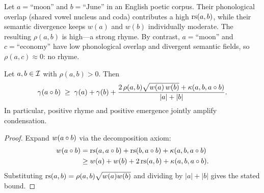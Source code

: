 \begin{example}
\label{ex:phono-rhyme}
Let $a = \text{``moon''}$ and $b = \text{``June''}$ in an English
poetic corpus.  Their phonological overlap (shared vowel nucleus and
coda) contributes a high $\mathrm{rs}(a,b)$, while their semantic divergence
keeps $w(a)$ and $w(b)$ individually moderate.  The resulting
$\rho(a,b)$ is high---a strong rhyme.  By contrast, $a =
\text{``moon''}$ and $c = \text{``economy''}$ have low phonological
overlap and divergent semantic fields, so $\rho(a,c) \approx 0$:
no rhyme.
\end{example}

\begin{theorem}
\label{thm:rhyme-condensation}
Let $a,b \in \mathcal{I}$ with $\rho(a,b) > 0$.  Then
\[
  \gamma(a \circ b)
  \;\ge\;
  \gamma(a) + \gamma(b)
  + \frac{2\,\rho(a,b)\sqrt{w(a)\,w(b)} + \kappa(a,b,a\circ b)}{|a|+|b|}.
\]
In particular, positive rhyme and positive emergence jointly
amplify condensation.
\end{theorem}

\begin{proof}
Expand $w(a\circ b)$ via the decomposition axiom:
\begin{align*}
  w(a\circ b)
  &= \mathrm{rs}(a,a\circ b) + \mathrm{rs}(b,a\circ b)
     + \kappa(a,b,a\circ b) \\
  &\ge w(a) + w(b)
     + 2\,\mathrm{rs}(a,b) + \kappa(a,b,a\circ b).
\end{align*}
Substituting $\mathrm{rs}(a,b) = \rho(a,b)\sqrt{w(a)w(b)}$ and dividing
by $|a|+|b|$ gives the stated bound.
\end{proof}

